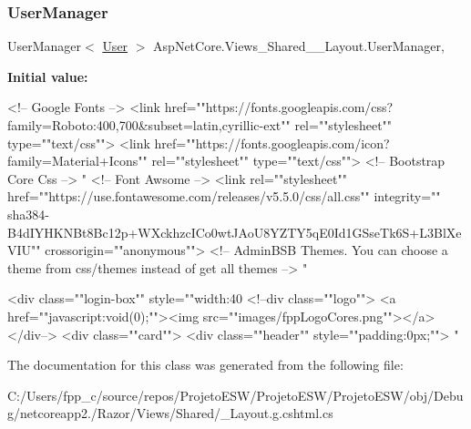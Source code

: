 \subsubsection{\texorpdfstring{User\+Manager}{UserManager}}
{\footnotesize\ttfamily User\+Manager$<$ \mbox{\hyperlink{class_projeto_e_s_w_1_1_models_1_1_user}{User}} $>$ Asp\+Net\+Core.\+Views\+\_\+\+Shared\+\_\+\+\_\+\+Layout.\+User\+Manager\hspace{0.3cm}{\ttfamily [get]}, {}}

{\bfseries Initial value\+:}
\begin{DoxyCode}

    <!-- Google Fonts -->
    <link href=\textcolor{stringliteral}{""}https:\textcolor{comment}{//fonts.googleapis.com/css?family=Roboto:400,700&subset=latin,cyrillic-ext""
       rel=""stylesheet"" type=""text/css"">}
    <link href=\textcolor{stringliteral}{""}https:\textcolor{comment}{//fonts.googleapis.com/icon?family=Material+Icons"" rel=""stylesheet""
       type=""text/css"">}
    <!-- Bootstrap Core Css -->
    \textcolor{stringliteral}{"}
\textcolor{stringliteral}{}
\textcolor{stringliteral}{    <!-- Font Awsome -->}
\textcolor{stringliteral}{    <link rel="}\textcolor{stringliteral}{"stylesheet"}\textcolor{stringliteral}{" href="}\textcolor{stringliteral}{"https://use.fontawesome.com/releases/v5.5.0/css/all.css"}\textcolor{stringliteral}{" integrity="}\textcolor{stringliteral}{"
      sha384-B4dIYHKNBt8Bc12p+WXckhzcICo0wtJAoU8YZTY5qE0Id1GSseTk6S+L3BlXeVIU"}\textcolor{stringliteral}{" crossorigin="}\textcolor{stringliteral}{"anonymous"}\textcolor{stringliteral}{">}
\textcolor{stringliteral}{}
\textcolor{stringliteral}{    <!-- AdminBSB Themes. You can choose a theme from css/themes instead of get all themes -->}
\textcolor{stringliteral}{    "}


    <div \textcolor{keyword}{class}=\textcolor{stringliteral}{""}login-box\textcolor{stringliteral}{""} style=\textcolor{stringliteral}{""}width:40%
        <!--div \textcolor{keyword}{class}=\textcolor{stringliteral}{""}logo\textcolor{stringliteral}{""}>
            <a href=\textcolor{stringliteral}{""}javascript:void(0);\textcolor{stringliteral}{""}><img src=\textcolor{stringliteral}{""}images/fppLogoCores.png\textcolor{stringliteral}{""}></a>
        </div-->
        <div \textcolor{keyword}{class}=\textcolor{stringliteral}{""}card\textcolor{stringliteral}{""}>
            <div \textcolor{keyword}{class}=\textcolor{stringliteral}{""}header\textcolor{stringliteral}{""} style=\textcolor{stringliteral}{""}padding:0px;\textcolor{stringliteral}{""}>
                \textcolor{stringliteral}{"}
\end{DoxyCode}


The documentation for this class was generated from the following file\+:\begin{DoxyCompactItemize}
\item 
C\+:/\+Users/fpp\+\_\+c/source/repos/\+Projeto\+E\+S\+W/\+Projeto\+E\+S\+W/\+Projeto\+E\+S\+W/obj/\+Debug/netcoreapp2./\+Razor/\+Views/\+Shared/\+\_\+\+Layout.\+g.\+cshtml.\+cs\end{DoxyCompactItemize}
